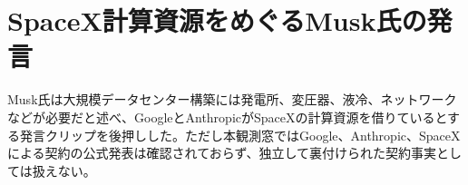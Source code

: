 \section{SpaceX計算資源をめぐるMusk氏の発言}
Musk氏は大規模データセンター構築には発電所、変圧器、液冷、ネットワークなどが必要だと述べ、GoogleとAnthropicがSpaceXの計算資源を借りているとする発言クリップを後押しした。ただし本観測窓ではGoogle、Anthropic、SpaceXによる契約の公式発表は確認されておらず、独立して裏付けられた契約事実としては扱えない。
